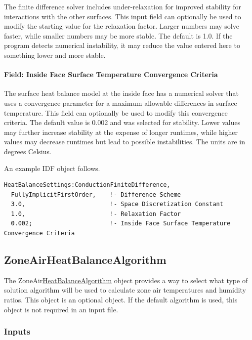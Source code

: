 The finite difference solver includes under-relaxation for improved stability for interactions with the other surfaces. This input field can optionally be used to modify the starting value for the relaxation factor. Larger numbers may solve faster, while smaller numbers may be more stable. The default is 1.0. If the program detects numerical instability, it may reduce the value entered here to something lower and more stable.

\paragraph{Field: Inside Face Surface Temperature Convergence Criteria}\label{field-inside-face-surface-temperature-convergence-criteria}

The surface heat balance model at the inside face has a numerical solver that uses a convergence parameter for a maximum allowable differences in surface temperature. This field can optionally be used to modify this convergence criteria. The default value is 0.002 and was selected for stability. Lower values may further increase stability at the expense of longer runtimes, while higher values may decrease runtimes but lead to possible instabilities. The units are in degrees Celsius.

An example IDF object follows.

\begin{lstlisting}
HeatBalanceSettings:ConductionFiniteDifference,
  FullyImplicitFirstOrder,    !- Difference Scheme
  3.0,                        !- Space Discretization Constant
  1.0,                        !- Relaxation Factor
  0.002;                      !- Inside Face Surface Temperature Convergence Criteria
\end{lstlisting}

\subsection{ZoneAirHeatBalanceAlgorithm}\label{zoneairheatbalancealgorithm}

The ZoneAir\hyperref[heatbalancealgorithm]{HeatBalanceAlgorithm} object provides a way to select what type of solution algorithm will be used to calculate zone air temperatures and humidity ratios. This object is an optional object. If the default algorithm is used, this object is not required in an input file.

\subsubsection{Inputs}\label{inputs-8-023}

